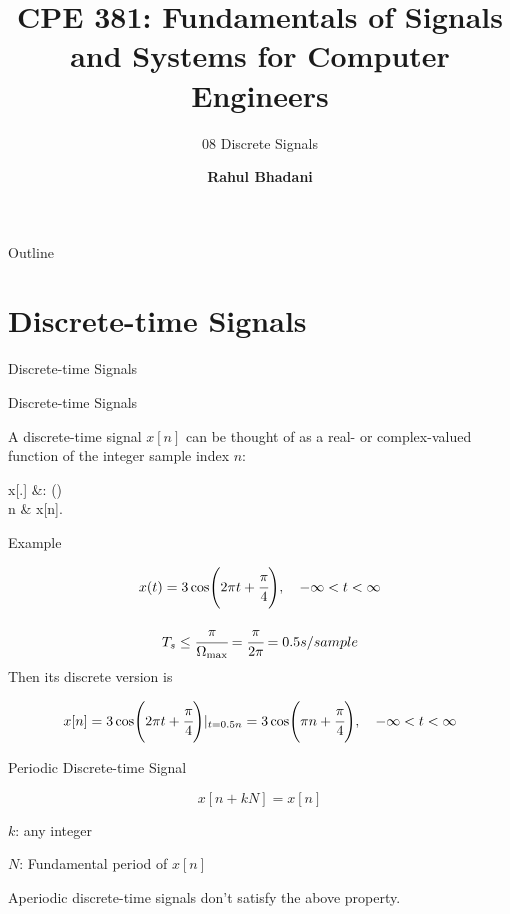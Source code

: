 \documentclass[aspectratio=169,xcolor=dvipsnames,svgnames,x11names,fleqn]{beamer}
\title[CPE 381: Signals and Systems]{CPE 381: Fundamentals of Signals and Systems for Computer Engineers} %
\subtitle{08 Discrete Signals}
\author[Rahul Bhadani] {{\Large \textbf{Rahul Bhadani}}}
\institute[UAH] %
{
    Electrical \& Computer Engineering,  The University of Alabama in Huntsville
}
\date
\begin{document}
\begin{frame}
\titlepage
\end{frame}

\begin{frame}{Outline}
    \tableofcontents
\end{frame}


\section{Discrete-time Signals}


\begin{frame}{}
    \begin{center}
    \Huge \bf \color{DarkBlue}
    \faSortNumericAsc
    
    Discrete-time Signals
\end{center}
\end{frame}


\begin{frame}{Discrete-time Signals}

A discrete-time signal $x[n]$ can be thought of as a real- or complex-valued function of the integer sample index $n$:
\begin{multiequation}
    x[.] &: \Ical \to \Rcal (\Ccal)\\
    n & \quad x[n].
\end{multiequation}
    
\end{frame}


\begin{frame}{Example}

$$
x(t) = 3 \cos(2\pi t + \cfrac{\pi}{4}), \quad -\infty < t < \infty
$$

$$
T_s \leq \cfrac{\pi}{\Omega_{\textrm{max}}} = \cfrac{\pi}{2\pi} = 0.5 s/sample
$$
Then its discrete version is

$$
x[n] = 3 \cos(2\pi t + \cfrac{\pi}{4}) |_{t = 0.5n} = 3\cos(\pi n + \cfrac{\pi}{4} ) , \quad -\infty < t < \infty
$$
    
\end{frame}


\begin{frame}{Periodic Discrete-time Signal}

$$
x[n + kN] = x[n]
$$

$k$: any integer

$N$: Fundamental period of $x[n]$

\begin{gradred}
    Aperiodic discrete-time signals don't satisfy the above property.
\end{gradred}
\end{frame}
\end{document}
